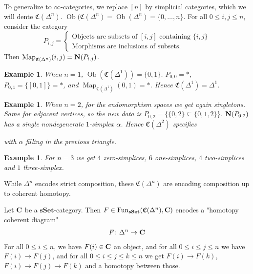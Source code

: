 \documentclass[A4paper, british]{amsart}
\theoremstyle{darkgreentheorem}
\theoremstyle{darkbluedefinition}
\theoremstyle{darkredexample}
\newtheorem{exa}[thm]{Example}
\theoremstyle{remark}
\DeclareMathOperator{\Fun}{Fun}
\DeclareMathOperator{\Ob}{Ob}
\DeclareMathOperator{\Map}{Map}
\newcommand{\sSet}{\mathbf{sSet}}
\newcommand{\1}{\mathbbm{1}}
\newcommand{\sub}{\subseteq}
\begin{document}
To generalize to $\infty$-categories, we replace $[n]$ by simplicial categories, which we will dente $\mathfrak{C}(\Delta^{n})$.
$\Ob(\mathfrak{C}(\Delta^{n})=\Ob(\Delta^{n})=\{0,\ldots,n\}$.
For all $0\leqslant i,j\leqslant n$, consider the category
\[ P_{i,j}=\begin{cases}
    \text{Objects are subsets of }[i,j]\text{ containing }\{i,j\} \\
    \text{Morphisms are inclusions of subsets.}
\end{cases}
\]
Then $\Map_{\mathfrak{C}(\Delta^{n})}(i,j)=\bfN(P_{i,j})$.

\begin{exa}
    When $n=1$, $\Ob(\mathfrak{C}(\Delta^{1}))=\{0,1\}$.
    $P_{0,0}=*$, $P_{0,1}=\{[0,1]\}=*$, and $\Map_{\mathfrak{C}(\Delta^{1})}(0,1)=*$.
    Hence $\mathfrak{C}(\Delta^{1})=\Delta^{1}$.
\end{exa}

\begin{exa}
    When $n=2$, for the endomorphism spaces we get again singletons.
    Same for adjacent vertices, so the new data is $P_{0,2}=\{ \{0,2\}\sub \{0,1,2\}\}$.
    $\mathbf{N}(P_{0,2})$ has a single nondegenerate $1$-simplex $\alpha$.
    Hence $\mathfrak{C}(\Delta^{2})$ specifies
    \begin{center}
    \end{center}
    with $\alpha$ filling in the previous triangle.
\end{exa}

\begin{exa}
    For $n=3$ we get $4$ zero-simplices, $6$ one-simplices, $4$ two-simplices and $1$ three-simplex.
\end{exa}

While $\Delta^{n}$ encodes strict composition, these $\mathfrak{C}(\Delta^{n})$ are encoding composition up to coherent homotopy.

Let $\mathbf{C}$ be a $\sSet$-category.
Then $F\in \Fun_{\sSet}(\mathfrak{C}(\Delta^{n}),\bfC)$ encodes a "homotopy coherent diagram"
\[ F\colon \Delta^{n}\to \mathbf{C} \]
For all $0\leqslant i\leqslant n$, we have $F(i)\in \mathbf{C}$ an object, and for all $0\leqslant i\leqslant j\leqslant n$ we have $F(i)\to F(j)$, and for all $0\leqslant i \leqslant j\leqslant k\leqslant n$ we get
$F(i)\to F(k)$, $F(i)\to F(j)\to F(k)$ and a homotopy between those.
\end{document}
